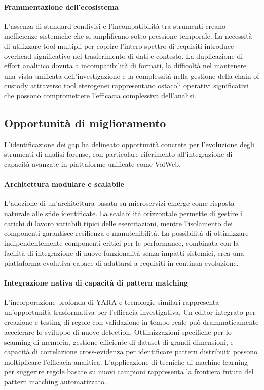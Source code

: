 \paragraph{Frammentazione dell'ecosistema}
L'assenza di standard condivisi e l'incompatibilità tra strumenti creano inefficienze sistemiche che si amplificano sotto pressione temporale. La necessità di utilizzare tool multipli per coprire l'intero spettro di requisiti introduce overhead significativo nel trasferimento di dati e contesto. La duplicazione di effort analitico dovuta a incompatibilità di formati, la difficoltà nel mantenere una vista unificata dell'investigazione e la complessità nella gestione della chain of custody attraverso tool eterogenei rappresentano ostacoli operativi significativi che possono compromettere l'efficacia complessiva dell'analisi.

\subsection{Opportunità di miglioramento}

L'identificazione dei gap ha delineato opportunità concrete per l'evoluzione degli strumenti di analisi forense, con particolare riferimento all'integrazione di capacità avanzate in piattaforme unificate come VolWeb.

\paragraph{Architettura modulare e scalabile}
L'adozione di un'architettura basata su microservizi emerge come risposta naturale alle sfide identificate. La scalabilità orizzontale permette di gestire i carichi di lavoro variabili tipici delle esercitazioni, mentre l'isolamento dei componenti garantisce resilienza e manutenibilità. La possibilità di ottimizzare indipendentemente componenti critici per le performance, combinata con la facilità di integrazione di nuove funzionalità senza impatti sistemici, crea una piattaforma evolutiva capace di adattarsi a requisiti in continua evoluzione.

\paragraph{Integrazione nativa di capacità di pattern matching}
L'incorporazione profonda di YARA e tecnologie similari rappresenta un'opportunità trasformativa per l'efficacia investigativa. Un editor integrato per creazione e testing di regole con validazione in tempo reale può drammaticamente accelerare lo sviluppo di nuove detection. Ottimizzazioni specifiche per lo scanning di memoria, gestione efficiente di dataset di grandi dimensioni, e capacità di correlazione cross-evidenza per identificare pattern distribuiti possono moltiplicare l'efficacia analitica. L'applicazione di tecniche di machine learning per suggerire regole basate su nuovi campioni rappresenta la frontiera futura del pattern matching automatizzato.

